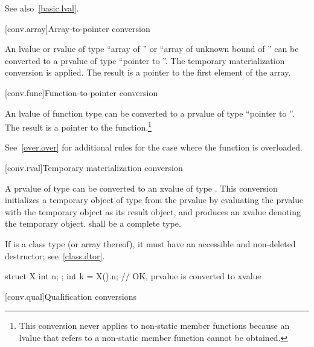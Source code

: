 \pnum
\begin{note}
See also~\ref{basic.lval}.
\end{note}

[conv.array]{Array-to-pointer conversion}

\pnum
{}%
%
%
An lvalue or rvalue of type ``array of  '' or ``array
of unknown bound of '' can be converted to a prvalue of type
``pointer to ''.
The temporary materialization conversion is applied.
The result is a pointer to the first element of the array.

[conv.func]{Function-to-pointer conversion}

\pnum
{}%
An lvalue of function type  can be converted to a prvalue of
type ``pointer to ''. The result is a pointer to the
function.\footnote{This conversion never applies to non-static member functions because an
lvalue that refers to a non-static member function cannot be obtained.}

\pnum
\begin{note}
See~\ref{over.over} for additional rules for the case where the function
is overloaded.
\end{note}

[conv.rval]{Temporary materialization conversion}
%

\pnum
A prvalue of type  can be converted to an xvalue of type .
This conversion initializes a temporary object of type  from the prvalue
by evaluating the prvalue with the temporary object as its result object,
and produces an xvalue denoting the temporary object.
 shall be a complete type.
\begin{note}
If  is a class type (or array thereof),
it must have an accessible and non-deleted destructor;
see~\ref{class.dtor}.
\end{note}
\begin{example}
\begin{codeblock}
struct X { int n; };
int k = X().n;      // OK,  prvalue is converted to xvalue
\end{codeblock}
\end{example}

[conv.qual]{Qualification conversions}


